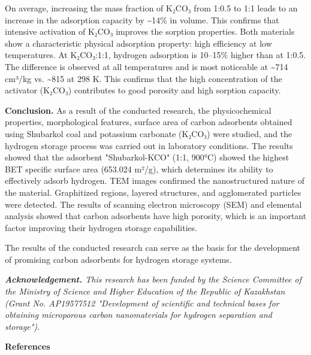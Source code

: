 \begin{multicols}{2}
On average, increasing the mass fraction of K₂CO₃ from 1:0.5 to 1:1
leads to an increase in the adsorption capacity by \textasciitilde14\%
in volume. This confirms that intensive activation of K₂CO₃ improves the
sorption properties. Both materials show a characteristic physical
adsorption property: high efficiency at low temperatures. At K₂CO₃:1:1,
hydrogen adsorption is 10--15\% higher than at 1:0.5. The difference is
observed at all temperatures and is most noticeable at
\textasciitilde714 cm³/kg vs. \textasciitilde815 at 298 K. This confirms
that the high concentration of the activator (K₂CO₃) contributes to good
porosity and high sorption capacity.

{\bfseries Conclusion.} As a result of the conducted research, the
physicochemical properties, morphological features, surface area of
\hspace{0pt}\hspace{0pt}carbon adsorbents obtained using Shubarkol coal
and potassium carbonate (K₂CO₃) were studied, and the hydrogen storage
process was carried out in laboratory conditions. The results showed
that the adsorbent "Shubarkol-KCO"
(1:1, 900°C) showed the highest BET specific surface area (653.024
m²/g), which determines its ability to effectively adsorb hydrogen. TEM
images confirmed the nanostructured nature of the material. Graphitized
regions, layered structures, and agglomerated particles were detected.
The results of scanning electron microscopy (SEM) and elemental analysis
showed that carbon adsorbents have high porosity, which is an important
factor improving their hydrogen storage capabilities.

The results of the conducted research can serve as the basis for the
development of promising carbon adsorbents for hydrogen storage systems.

\emph{{\bfseries Acknowledgement.} This research has been funded by the
Science Committee of the Ministry of Science and Higher Education of the
Republic of Kazakhstan (Grant No. AP19577512 "Development of scientific
and technical bases for obtaining microporous carbon nanomaterials for
hydrogen separation and storage").}
\end{multicols}

\begin{center}
{\bfseries References}
\end{center}

